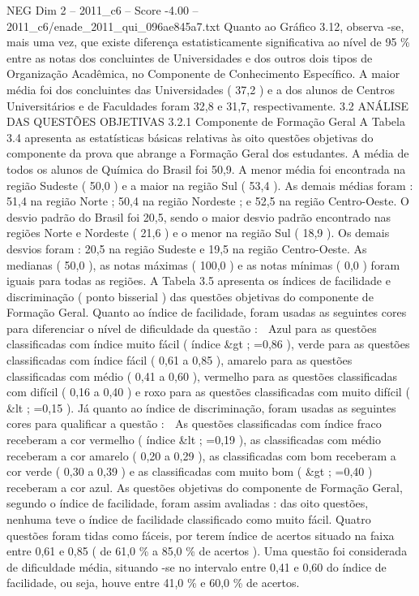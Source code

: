 \begin{textsample}{NEG Dim 2 – 2011\_c6 – Score -4.00 – 2011\_c6/enade\_2011\_qui\_096ae845a7.txt}
Quanto ao Gráfico 3.12, observa -se, mais uma vez, que existe diferença estatisticamente significativa ao nível de 95 \% entre as notas dos concluintes de Universidades e dos outros dois tipos de Organização Acadêmica, no Componente de Conhecimento Específico.
A maior média foi dos concluintes das Universidades ( 37,2 ) e a dos alunos de Centros Universitários e de Faculdades foram 32,8 e 31,7, respectivamente. 3.2 ANÁLISE DAS QUESTÕES OBJETIVAS 3.2.1 Componente de Formação Geral A Tabela 3.4 apresenta as estatísticas básicas relativas às oito questões objetivas do componente da prova que abrange a Formação Geral dos estudantes.
A média de todos os alunos de Química do Brasil foi 50,9.
A menor média foi encontrada na região Sudeste ( 50,0 ) e a maior na região Sul ( 53,4 ).
As demais médias foram : 51,4 na região Norte ; 50,4 na região Nordeste ; e 52,5 na região Centro-Oeste.
O desvio padrão do Brasil foi 20,5, sendo o maior desvio padrão encontrado nas regiões Norte e Nordeste ( 21,6 ) e o menor na região Sul ( 18,9 ).
Os demais desvios foram : 20,5 na região Sudeste e 19,5 na região Centro-Oeste.
As medianas ( 50,0 ), as notas máximas ( 100,0 ) e as notas mínimas ( 0,0 ) foram iguais para todas as regiões.
A Tabela 3.5 apresenta os índices de facilidade e discriminação ( ponto bisserial ) das questões objetivas do componente de Formação Geral.
Quanto ao índice de facilidade, foram usadas as seguintes cores para diferenciar o nível de dificuldade da questão :  Azul para as questões classificadas com índice muito fácil ( índice \&gt ; =0,86 ), verde para as questões classificadas com índice fácil ( 0,61 a 0,85 ), amarelo para as questões classificadas com médio ( 0,41 a 0,60 ), vermelho para as questões classificadas com difícil ( 0,16 a 0,40 ) e roxo para as questões classificadas com muito difícil ( \&lt ; =0,15 ).
Já quanto ao índice de discriminação, foram usadas as seguintes cores para qualificar a questão :  As questões classificadas com índice fraco receberam a cor vermelho ( índice \&lt ; =0,19 ), as classificadas com médio receberam a cor amarelo ( 0,20 a 0,29 ), as classificadas com bom receberam a cor verde ( 0,30 a 0,39 ) e as classificadas com muito bom ( \&gt ; =0,40 ) receberam a cor azul.
As questões objetivas do componente de Formação Geral, segundo o índice de facilidade, foram assim avaliadas : das oito questões, nenhuma teve o índice de facilidade classificado como muito fácil.
Quatro questões foram tidas como fáceis, por terem índice de acertos situado na faixa entre 0,61 e 0,85 ( de 61,0 \% a 85,0 \% de acertos ).
Uma questão foi considerada de dificuldade média, situando -se no intervalo entre 0,41 e 0,60 do índice de facilidade, ou seja, houve entre 41,0 \% e 60,0 \% de acertos.

\end{textsample}
